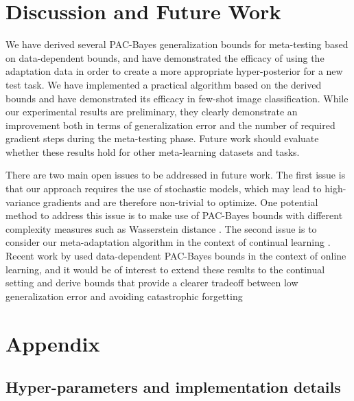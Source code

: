 \documentclass{article} %
\theoremstyle{definition}
\begin{document}
\section{Discussion and Future Work}

We have derived several PAC-Bayes generalization bounds for meta-testing based on data-dependent bounds, and have demonstrated the efficacy of using the adaptation data in order to create a more appropriate hyper-posterior for a new test task.
We have implemented a practical algorithm based on the derived bounds and have demonstrated its efficacy in few-shot image classification.
While our experimental results are preliminary, they clearly demonstrate an improvement both in terms of generalization error and the number of required gradient steps during the meta-testing phase. Future work should evaluate whether these results hold for other meta-learning datasets and tasks.

There are two main open issues to be addressed in future work. 
The first issue is that our approach requires the use of stochastic models, which may lead to high-variance gradients and are therefore non-trivial to optimize. One potential method to address this issue is to make use of PAC-Bayes bounds with different complexity measures such as Wasserstein distance \citep{Ohnishi2021, Amit2022}.
The second issue is to consider our meta-adaptation algorithm in the context of continual learning \citep{Kirkpatrick2017}. Recent work by \citet{Haddouche2022} used data-dependent PAC-Bayes bounds in the context of online learning, and it would be of interest to extend these results to the continual setting and derive bounds that provide a clearer tradeoff between low generalization error and avoiding catastrophic forgetting

%


\clearpage
\appendix 
\section{Appendix}
\label{sec:appendix}

\subsection{Hyper-parameters and implementation details} \label{append:hyper-params}
\end{document}
